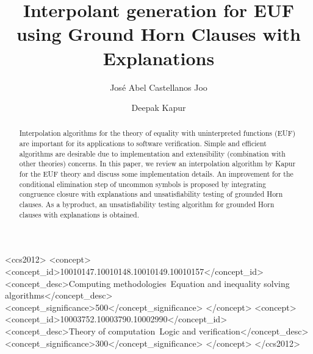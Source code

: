 \documentclass[10pt, sigconf,authordraft]{acmart}
\begin{document}
\title{Interpolant generation for EUF using Ground Horn Clauses with Explanations}

\author{Jos\'e Abel Castellanos Joo}
\author{Deepak Kapur}

\renewcommand{\shortauthors}{Castellanos and Kapur}

\begin{abstract}
  Interpolation algorithms for the theory of equality with uninterpreted functions (EUF)
  are important for its applications
  to software verification. Simple and efficient algorithms are desirable
  due to implementation and extensibility (combination with other theories) concerns.
  In this paper, we review an interpolation algorithm by Kapur for the
  EUF theory and discuss some implementation details. An improvement
  for the conditional elimination step of uncommon symbols is proposed by integrating
  congruence closure with explanations and unsatisfiability
  testing of grounded Horn clauses. As a byproduct, an unsatisfiability
  testing algorithm for grounded Horn clauses with explanations is obtained.
\end{abstract}


\begin{CCSXML}
<ccs2012>
<concept>
<concept_id>10010147.10010148.10010149.10010157</concept_id>
<concept_desc>Computing methodologies~Equation and inequality solving algorithms</concept_desc>
<concept_significance>500</concept_significance>
</concept>
<concept>
<concept_id>10003752.10003790.10002990</concept_id>
<concept_desc>Theory of computation~Logic and verification</concept_desc>
<concept_significance>300</concept_significance>
</concept>
</ccs2012>
\end{CCSXML}
\end{document}
